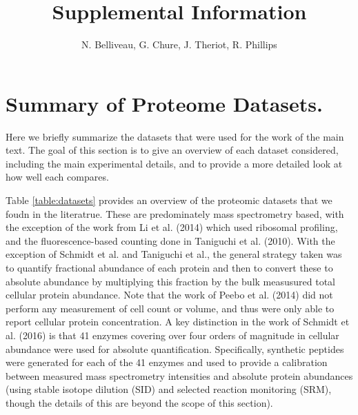 \documentclass[11pt]{article}
\author{N. Belliveau, G. Chure, J. Theriot, R. Phillips}
\begin{document}
\title{Supplemental Information}
\maketitle

\section{Summary of Proteome Datasets.}

Here we briefly summarize the datasets that were used for the work of the
main text. The goal of this section is to give an overview of each
dataset considered, including the main experimental details, and to provide a
more detailed look at how well each compares.

Table \ref{table:datasets} provides an overview of the proteomic datasets that
we foudn in the literatrue. These are predominately mass spectrometry based,
with the exception of the work from Li et al. (2014) which used ribosomal
profiling, and the fluorescence-based counting done in Taniguchi et al. (2010).
With the exception of Schmidt et al. and Taniguchi et al., the general strategy
taken was to quantify fractional abundance of each protein and then to convert
these to absolute abundance by multiplying this fraction by the bulk measusured
total cellular protein abundance. Note that the work of Peebo et al. (2014) did
not perform any measurement of cell count or volume, and thus were only able to
report cellular protein concentration. A key distinction in the work of Schmidt
et al. (2016) is that 41 enzymes covering over four orders of magnitude in
cellular abundance were used for absolute quantification. Specifically,
synthetic peptides were generated for each of the 41 enzymes and used to provide
a calibration between measured mass spectrometry intensities and absolute
protein abundances (using stable isotope dilution (SID) and selected reaction
monitoring (SRM), though the details of this are beyond the scope of this
section).
\end{document}
